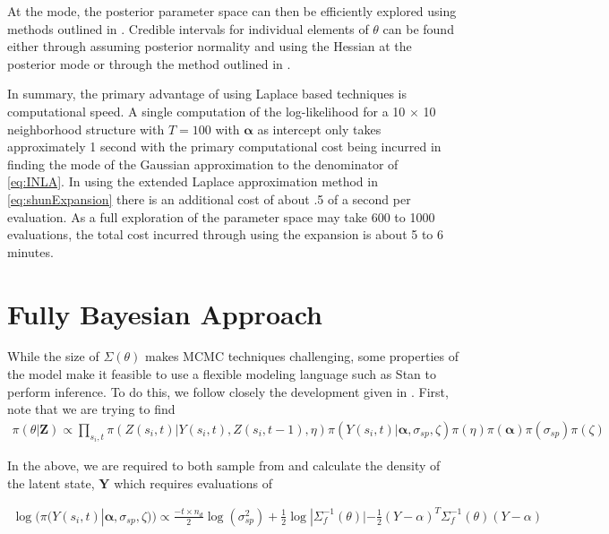 \documentclass[11pt]{isuthesis}
\begin{document}
	At the mode, the posterior parameter space can then be efficiently explored using methods outlined in \cite{rue2009approximate}.  Credible intervals for individual elements of $\theta$ can be found either through assuming posterior normality and using the Hessian at the posterior mode or through the method outlined in \cite{ferkingstad2015improving}.  
	
	In summary, the primary advantage of using Laplace based techniques is computational speed.  A single computation of the log-likelihood for a 10 $\times$ 10 neighborhood structure with $T=100$ with $\boldsymbol{\alpha}$ as intercept only takes approximately 1 second with the primary computational cost being incurred in finding the mode of the Gaussian approximation to the denominator of \eqref{eq:INLA}.  In using the extended Laplace approximation method in \eqref{eq:shunExpansion} there is an additional cost of about .5 of a second per evaluation.  As a full exploration of the parameter space may take 600 to 1000 evaluations, the total cost incurred through using the expansion is about 5 to 6 minutes.
	\section{Fully Bayesian Approach}
	
	While the size of $\Sigma(\theta)$ makes MCMC techniques challenging, some properties of the model make it feasible to use a flexible modeling language such as Stan to perform inference.  To do this, we follow closely the development given in \cite{joseph}.  First, note that we are trying to find
	\begin{align}
	\pi(\theta | \boldsymbol{Z})\propto \prod_{s_i,t} \pi(Z(s_i,t)|Y(s_i,t),Z(s_i,t-1),\eta) \pi(Y(s_i,t)|\boldsymbol{\alpha},\sigma_{sp},\zeta)\pi(\eta)\pi(\boldsymbol{\alpha})\pi(\sigma_{sp})\pi(\zeta)
	\end{align}
	
	In the above, we are required to both sample from and calculate the density of the latent state, $\boldsymbol{Y}$ which requires evaluations of 
	
	
	\begin{align}
	\log(\pi(Y(s_i,t)|\boldsymbol{\alpha},\sigma_{sp},\zeta)) \propto \frac{-t \times n_d}{2}\log(\sigma_{sp}^2) + \frac{1}{2} \log | \Sigma_f^{-1}(\theta)| - \frac{1}{2}(Y-\alpha)^T\Sigma_f^{-1}(\theta)(Y-\alpha) \label{eq:log Y}
	\end{align}
	
\end{document}
